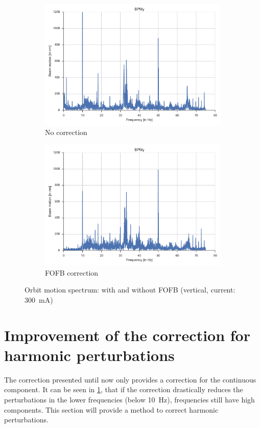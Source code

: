 \begin{figure}
    \centering
    \begin{subfigure}[b]{0.8\textwidth}
        \includegraphics[width=\linewidth]{img/fft_no_corr}
        \caption{No correction}
    \end{subfigure}
    
    \begin{subfigure}[b]{0.8\textwidth}
        \includegraphics[width=\linewidth]{img/fft_fofb}
        \caption{FOFB correction}
    \end{subfigure}
    \caption{\label{fig:compare_fofb}Orbit motion spectrum: with and without FOFB (vertical, current: \SI{300}{\milli\ampere})}
\end{figure}

\section{Improvement of the correction for harmonic perturbations}
\label{sec:dyn_corr}
The correction presented until now only provides a correction for the continuous component. It can be seen in \cref{fig:compare_fofb}, that if the correction drastically reduces the perturbations in the lower frequencies (below \SI{10}{\hertz}), frequencies still have high components. This section will provide a method to correct harmonic perturbations.


